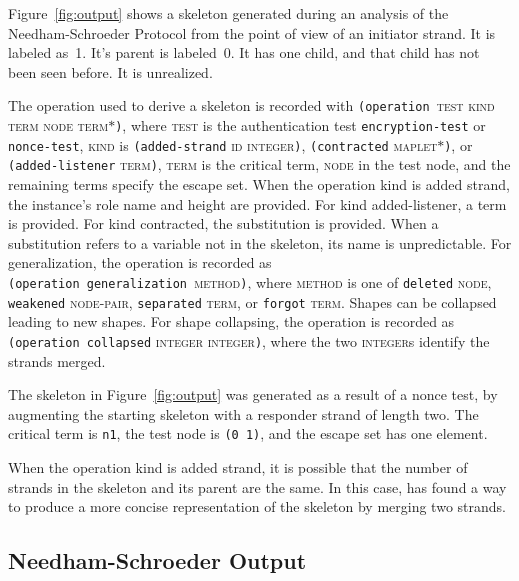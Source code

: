 \documentclass[12pt]{article}
\begin{document}
Figure~\ref{fig:output} shows a skeleton generated during an analysis
of the Needham-Schroeder Protocol from the point of view of an
initiator strand.  It is labeled as~1.  It's parent is labeled~0.  It
has one child, and that child has not been seen before.  It is
unrealized.

\label{sec:operation}
\begin{sloppypar}
The operation used to derive a skeleton is recorded with
\texttt{(operation~}\textsc{test kind term node
  term$\ast$}\texttt{)}, where \textsc{test} is the authentication
test \texttt{encryption-test} or \texttt{nonce-test}, \textsc{kind} is
\texttt{(added-strand} \textsc{id} \textsc{integer}\texttt{)},
\texttt{(contracted} \textsc{maplet$\ast$}\texttt{)}, or
\texttt{(added-listener} \textsc{term}\texttt{)}, \textsc{term} is the
critical term, \textsc{node} in the test node, and the remaining terms
specify the escape set. When the operation kind is added strand, the
instance's role name and height are provided. For kind added-listener,
a term is provided. For kind contracted, the substitution is
provided. When a substitution refers to a variable not in the
skeleton, its name is unpredictable. For generalization, the operation
is recorded as
\texttt{(operation~generalization~}\textsc{method}\texttt{)}, where
\textsc{method} is one of \texttt{deleted} \textsc{node},
\texttt{weakened} \textsc{node-pair}, \texttt{separated}
\textsc{term}, or \texttt{forgot} \textsc{term}.  Shapes can be
collapsed leading to new shapes.  For shape collapsing, the operation
is recorded as \texttt{(operation~collapsed} \textsc{integer}
\textsc{integer}\texttt{)}, where the two \textsc{integer}s identify
the strands merged.
\end{sloppypar}

The skeleton in Figure~\ref{fig:output} was generated as a result of a
nonce test, by augmenting the starting skeleton with a responder
strand of length two.  The critical term is \texttt{n1}, the test
node is \texttt{(0~1)}, and the escape set has one element.

When the operation kind is added strand, it is possible that the
number of strands in the skeleton and its parent are the same.  In
this case, {\cpsa} has found a way to produce a more concise
representation of the skeleton by merging two strands.

\subsection{Needham-Schroeder Output}
\end{document}
